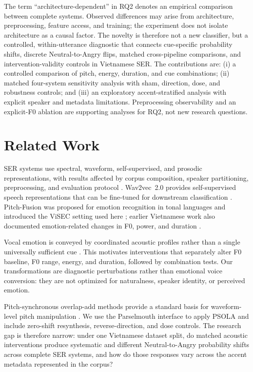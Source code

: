\documentclass[a4paper,runningheads]{llncs}
\begin{document}
The term ``architecture-dependent'' in RQ2 denotes an empirical comparison between complete systems. Observed differences may arise from architecture, preprocessing, feature access, and training; the experiment does not isolate architecture as a causal factor. The novelty is therefore not a new classifier, but a controlled, within-utterance diagnostic that connects cue-specific probability shifts, discrete Neutral-to-Angry flips, matched cross-pipeline comparisons, and intervention-validity controls in Vietnamese SER. The contributions are: (i) a controlled comparison of pitch, energy, duration, and cue combinations; (ii) matched four-system sensitivity analysis with sham, direction, dose, and robustness controls; and (iii) an exploratory accent-stratified analysis with explicit speaker and metadata limitations. Preprocessing observability and an explicit-F0 ablation are supporting analyses for RQ2, not new research questions.

\section{Related Work}

SER systems use spectral, waveform, self-supervised, and prosodic representations, with results affected by corpus composition, speaker partitioning, preprocessing, and evaluation protocol \cite{akcay2020ser,madanian2023ser}. Wav2vec~2.0 provides self-supervised speech representations that can be fine-tuned for downstream classification \cite{baevski2020wav2vec2}. Pitch-Fusion was proposed for emotion recognition in tonal languages and introduced the ViSEC setting used here \cite{thanh2024pitchfusion}; earlier Vietnamese work also documented emotion-related changes in F0, power, and duration \cite{ngo2012vietnameseprosody}.

Vocal emotion is conveyed by coordinated acoustic profiles rather than a single universally sufficient cue \cite{scherer1991vocal}. This motivates interventions that separately alter F0 baseline, F0 range, energy, and duration, followed by combination tests. Our transformations are diagnostic perturbations rather than emotional voice conversion: they are not optimized for naturalness, speaker identity, or perceived emotion.

Pitch-synchronous overlap-add methods provide a standard basis for waveform-level pitch manipulation \cite{moulines1990psola}. We use the Parselmouth interface \cite{jadoul2018parselmouth} to apply PSOLA and include zero-shift resynthesis, reverse-direction, and dose controls. The research gap is therefore narrow: under one Vietnamese dataset split, do matched acoustic interventions produce systematic and different Neutral-to-Angry probability shifts across complete SER systems, and how do those responses vary across the accent metadata represented in the corpus?
\end{document}

